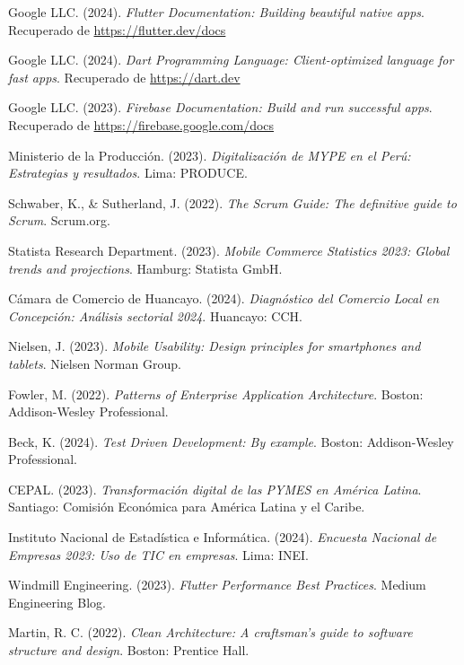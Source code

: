 \documentclass[12pt,a4paper]{report}
\begin{document}
\begin{thebibliography}{25}

	Google LLC. (2024). \textit{Flutter Documentation: Building beautiful native apps}. Recuperado de \url{https://flutter.dev/docs}

	Google LLC. (2024). \textit{Dart Programming Language: Client-optimized language for fast apps}. Recuperado de \url{https://dart.dev}

	Google LLC. (2023). \textit{Firebase Documentation: Build and run successful apps}. Recuperado de \url{https://firebase.google.com/docs}

	Ministerio de la Producción. (2023). \textit{Digitalización de MYPE en el Perú: Estrategias y resultados}. Lima: PRODUCE.

	Schwaber, K., \& Sutherland, J. (2022). \textit{The Scrum Guide: The definitive guide to Scrum}. Scrum.org.

	Statista Research Department. (2023). \textit{Mobile Commerce Statistics 2023: Global trends and projections}. Hamburg: Statista GmbH.

	Cámara de Comercio de Huancayo. (2024). \textit{Diagnóstico del Comercio Local en Concepción: Análisis sectorial 2024}. Huancayo: CCH.

	Nielsen, J. (2023). \textit{Mobile Usability: Design principles for smartphones and tablets}. Nielsen Norman Group.

	Fowler, M. (2022). \textit{Patterns of Enterprise Application Architecture}. Boston: Addison-Wesley Professional.

	Beck, K. (2024). \textit{Test Driven Development: By example}. Boston: Addison-Wesley Professional.

	CEPAL. (2023). \textit{Transformación digital de las PYMES en América Latina}. Santiago: Comisión Económica para América Latina y el Caribe.

	Instituto Nacional de Estadística e Informática. (2024). \textit{Encuesta Nacional de Empresas 2023: Uso de TIC en empresas}. Lima: INEI.

	Windmill Engineering. (2023). \textit{Flutter Performance Best Practices}. Medium Engineering Blog.

	Martin, R. C. (2022). \textit{Clean Architecture: A craftsman's guide to software structure and design}. Boston: Prentice Hall.


\end{thebibliography}
\end{document}

